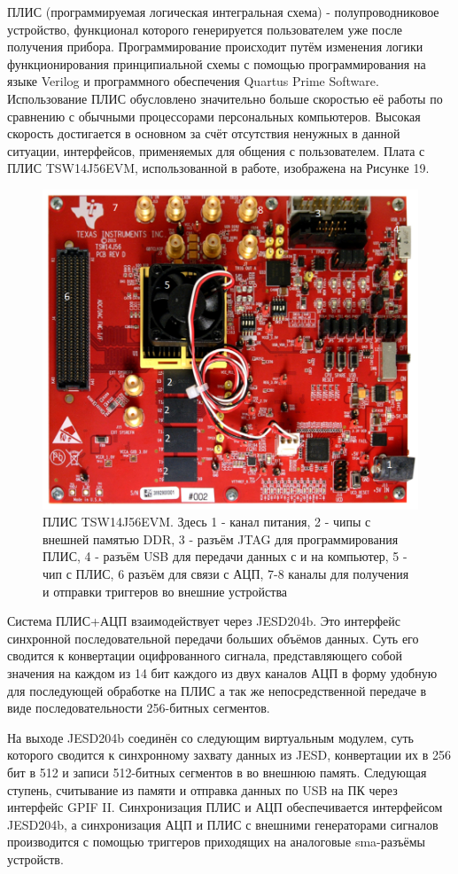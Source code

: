 ПЛИС (программируемая логическая интегральная схема) - полупроводниковое устройство, функционал которого генерируется пользователем уже после получения прибора. Программирование происходит путём изменения логики функционирования принципиальной схемы с помощью программирования на языке Verilog  и программного обеспечения Quartus Prime Software. Использование ПЛИС обусловлено значительно больше скоростью её работы по сравнению с обычными процессорами персональных компьютеров. Высокая скорость достигается в основном за счёт отсутствия ненужных в данной ситуации, интерфейсов, применяемых для общения с пользователем. Плата с ПЛИС TSW14J56EVM, использованной в работе, изображена на Рисунке 19.
\begin{figure}[h]
	\centering
	\includegraphics[width=0.5\linewidth]{pictures/fpga}
	\caption{ПЛИС TSW14J56EVM. Здесь 1 - канал питания, 2 - чипы с внешней памятью DDR, 3 - разъём JTAG для программирования ПЛИС, 4 - разъём USB для передачи данных с и на компьютер, 5 - чип с ПЛИС, 6 разъём для связи с АЦП, 7-8 каналы для получения и отправки триггеров во внешние устройства }
	\label{fig:fpga}
\end{figure}

Система ПЛИС+АЦП взаимодействует через JESD204b. Это интерфейс синхронной последовательной передачи больших объёмов данных. Суть его сводится к конвертации оцифрованного сигнала, представляющего собой значения на каждом из 14 бит каждого из двух каналов  АЦП в форму удобную для последующей обработке на ПЛИС а так же непосредственной передаче в виде последовательности 256-битных сегментов. 

На выходе JESD204b соединён со следующим виртуальным модулем, суть которого сводится к синхронному захвату данных из JESD, конвертации их в 256 бит в 512 и записи 512-битных сегментов в во внешнюю память. Следующая ступень, считывание из памяти и отправка данных по USB на ПК через интерфейс GPIF II. Синхронизация ПЛИС и АЦП обеспечивается интерфейсом JESD204b, а синхронизация АЦП и ПЛИС с внешними генераторами сигналов производится с помощью триггеров приходящих на аналоговые sma-разъёмы устройств.

